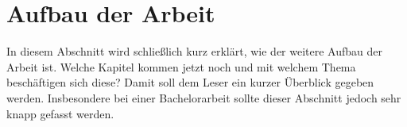 \section{Aufbau der Arbeit}

In diesem Abschnitt wird schließlich kurz erklärt, wie der weitere Aufbau der Arbeit ist. Welche Kapitel kommen jetzt noch und mit welchem Thema beschäftigen sich diese? Damit soll dem Leser ein kurzer Überblick gegeben werden. Insbesondere bei einer Bachelorarbeit sollte dieser Abschnitt jedoch sehr knapp gefasst werden.
